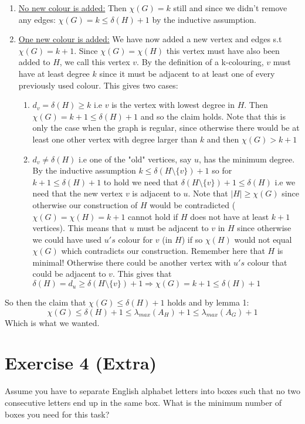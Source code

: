 \documentclass{article}
\begin{document}
\begin{enumerate}
    \item \underline{No new colour is added:} Then $\chi(G) = k$ still and since we didn't remove any edges: $\chi(G) = k \leq \delta(H) + 1$ by the inductive assumption.
    \item \underline{One new colour is added:} We have now added a new vertex and edges s.t $\chi(G) = k+1$.
    Since $\chi(G) = \chi(H)$ this vertex must have also been added to $H$, we call this vertex $v$. By the definition of a k-colouring, $v$ must have at least degree $k$ since it must be adjacent to at least one of every previously used colour. This gives two cases:
    
\begin{enumerate}
    \item $d_{v} = \delta(H) \geq k$ i.e $v$ is the vertex with lowest degree in $H$. Then $\chi(G) = k+1 \leq \delta(H) + 1$ and so the claim holds. Note that this is only the case when the graph is regular, since otherwise there would be at least one other vertex with degree larger than $k$ and then $\chi(G) > k+1$
    
    \item $d_{v} \neq \delta(H)$ i.e one of the "old" vertices, say $u$, has the minimum degree. By the inductive assumption $k \leq \delta(H \setminus \{v\}) + 1$ so for $k+1 \leq \delta(H) +1$ to hold we need that $\delta(H \setminus \{v\}) + 1 \leq \delta(H)$ i.e we need that the new vertex $v$ is adjacent to $u$. Note that $| H | \geq \chi(G)$ since otherwise our construction of $H$ would be contradicted ($\chi(G) = \chi(H) = k+1$ cannot hold if $H$ does not have at least $k+1$ vertices). This means that $u$ must be adjacent to $v$ in $H$ since otherwise we could have used $u's$ colour for $v$ (in $H$) if so $\chi(H) $ would not equal $ \chi(G)$ which contradicts our construction. Remember here that $H$ is minimal! Otherwise there could be another vertex with $u's$ colour that could be adjacent to $v$. This gives that $\delta(H) = d_{u} \geq \delta(H \setminus \{v\}) +1  \Rightarrow  \chi(G) = k+1 \leq \delta(H) +1$
\end{enumerate}
\end{enumerate}

So then the claim that $\chi(G) \leq \delta(H) + 1$ holds and by lemma 1: $$\chi(G) \leq \delta(H) + 1 \leq \lambda_{max}(A_{H}) + 1 \leq \lambda_{max}(A_{G}) + 1$$
Which is what we wanted.

\section*{Exercise 4 (Extra)}
Assume you have to separate English alphabet letters into boxes such that no two consecutive letters end up in the same box. What is the minimum number of boxes you need for this task?
\end{document}
